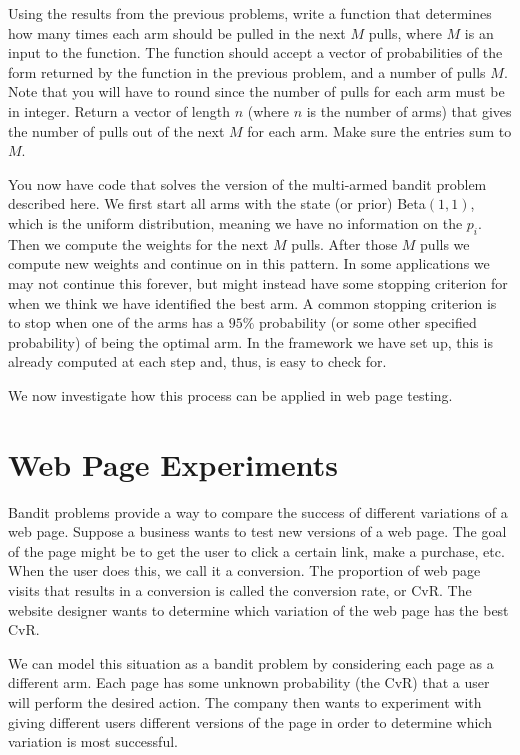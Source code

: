 \begin{problem}
Using the results from the previous problems, write a function  that determines how many
times each arm should be pulled in the next $M$ pulls, where $M$ is an input to the function.
The function should accept a vector of probabilities of the form returned by the
function in the previous problem, and a number of pulls $M$.
Note that you will have to round since the number of pulls for each arm must be in integer.
Return a vector of length $n$ (where $n$ is the number of arms) that gives the number of
pulls out of the next $M$ for each arm.  Make sure the entries sum to $M$.
\end{problem}

You now have code that solves the version of the multi-armed bandit problem described here.
We first start all arms with the state (or prior) Beta$(1,1)$,
which is the uniform distribution, meaning we have no information on the $p_i$.
Then we compute the weights for the next $M$ pulls.
After those $M$ pulls we compute new weights and continue on in this pattern.
In some applications we may not continue this forever, but might instead have some stopping
criterion for when we think we have identified the best arm.
A common stopping criterion is to stop when one of the arms has a $95\%$ probability
(or some other specified probability) of being the optimal arm.
In the framework we have set up, this is already computed at each step and, thus, is easy to check for.

We now investigate how this process can be applied
in web page testing.

\section*{Web Page Experiments}
Bandit problems provide a way to compare the success of different variations of a web page.
Suppose a business wants to test new versions of a web page.
The goal of the page might be to get the user to click a certain link, make a purchase, etc.
When the user does this, we call it a conversion.  The proportion of web page visits
that results in a conversion is called the conversion rate, or CvR.
The website designer wants to determine which variation of the web page has the best CvR.

We can model this situation as a bandit problem by considering each page as a different arm.
Each page has some unknown probability (the CvR) that a user will perform the desired action.
The company then wants to experiment with giving different users different versions of
the page in order to determine which variation is most successful.

